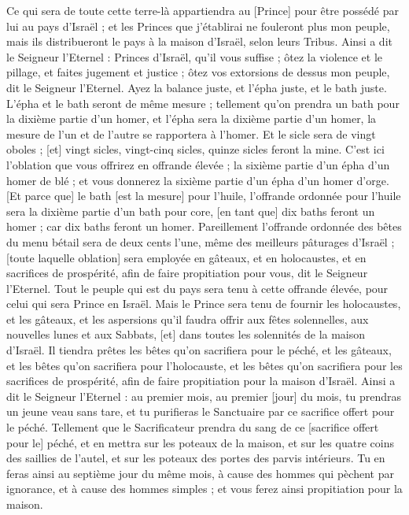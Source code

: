 \begin{multicols}{2}
Ce qui sera de toute cette terre-là appartiendra au [Prince] pour être possédé par lui au pays d'Israël ; et les Princes que j'établirai ne fouleront plus mon peuple, mais ils distribueront le pays à la maison d'Israël, selon leurs Tribus.
Ainsi a dit le Seigneur l'Eternel : Princes d'Israël, qu'il vous suffise ; ôtez la violence et le pillage, et faites jugement et justice ; ôtez vos extorsions de dessus mon peuple, dit le Seigneur l'Eternel.
Ayez la balance juste, et l'épha juste, et le bath juste.
L'épha et le bath seront de même mesure ; tellement qu'on prendra un bath pour la dixième partie d'un homer, et l'épha sera la dixième partie d'un homer, la mesure de l'un et de l'autre se rapportera à l'homer.
Et le sicle sera de vingt oboles ; [et] vingt sicles, vingt-cinq sicles, quinze sicles feront la mine.
C'est ici l'oblation que vous offrirez en offrande élevée ; la sixième partie d'un épha d'un homer de blé ; et vous donnerez la sixième partie d'un épha d'un homer d'orge.
[Et parce que] le bath [est la mesure] pour l'huile, l'offrande ordonnée pour l'huile sera la dixième partie d'un bath pour core, [en tant que] dix baths feront un homer ; car dix baths feront un homer.
Pareillement l'offrande ordonnée des bêtes du menu bétail sera de deux cents l'une, même des meilleurs pâturages d'Israël ; [toute laquelle oblation] sera employée en gâteaux, et en holocaustes, et en sacrifices de prospérité, afin de faire propitiation pour vous, dit le Seigneur l'Eternel.
Tout le peuple qui est du pays sera tenu à cette offrande élevée, pour celui qui sera Prince en Israël.
Mais le Prince sera tenu de fournir les holocaustes, et les gâteaux, et les aspersions qu'il faudra offrir aux fêtes solennelles, aux nouvelles lunes et aux Sabbats, [et] dans toutes les solennités de la maison d'Israël. Il tiendra prêtes les bêtes qu'on sacrifiera pour le péché, et les gâteaux, et les bêtes qu'on sacrifiera pour l'holocauste, et les bêtes qu'on sacrifiera pour les sacrifices de prospérité, afin de faire propitiation pour la maison d'Israël.
Ainsi a dit le Seigneur l'Eternel : au premier mois, au premier [jour] du mois, tu prendras un jeune veau sans tare, et tu purifieras le Sanctuaire par ce sacrifice offert pour le péché.
Tellement que le Sacrificateur prendra du sang de ce [sacrifice offert pour le] péché, et en mettra sur les poteaux de la maison, et sur les quatre coins des saillies de l'autel, et sur les poteaux des portes des parvis intérieurs.
Tu en feras ainsi au septième jour du même mois, à cause des hommes qui pèchent par ignorance, et à cause des hommes simples ; et vous ferez ainsi propitiation pour la maison.

\end{multicols}
